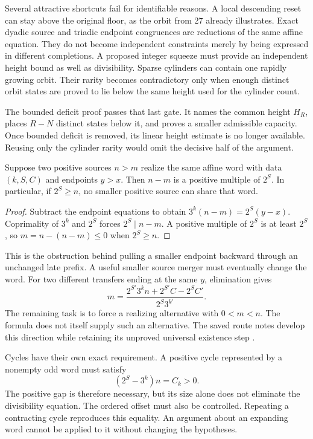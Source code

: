 Several attractive shortcuts fail for identifiable reasons. A local descending reset can stay above the original floor, as the orbit from 27 already illustrates. Exact dyadic source and triadic endpoint congruences are reductions of the same affine equation. They do not become independent constraints merely by being expressed in different completions. A proposed integer squeeze must provide an independent height bound as well as divisibility. Sparse cylinders can contain one rapidly growing orbit. Their rarity becomes contradictory only when enough distinct orbit states are proved to lie below the same height used for the cylinder count.

The bounded deficit proof passes that last gate. It names the common height $H_R$, places $R-N$ distinct states below it, and proves a smaller admissible capacity. Once bounded deficit is removed, its linear height estimate is no longer available. Reusing only the cylinder rarity would omit the decisive half of the argument.

\begin{proposition}\label{prop:merger}
Suppose two positive sources $n>m$ realize the same affine word with data $(k,S,C)$ and endpoints $y>x$. Then $n-m$ is a positive multiple of $2^S$. In particular, if $2^S\ge n$, no smaller positive source can share that word.
\end{proposition}
\begin{proof}
Subtract the endpoint equations to obtain $3^k(n-m)=2^S(y-x)$. Coprimality of $3^k$ and $2^S$ forces $2^S\mid n-m$. A positive multiple of $2^S$ is at least $2^S$, so $m=n-(n-m)\le0$ when $2^S\ge n$.
\end{proof}

This is the obstruction behind pulling a smaller endpoint backward through an unchanged late prefix. A useful smaller source merger must eventually change the word. For two different transfers ending at the same $y$, elimination gives
\[
m=\frac{2^{S'}3^k n+2^{S'}C-2^S C'}{2^S3^{k'}}.
\]
The remaining task is to force a realizing alternative with $0<m<n$. The formula does not itself supply such an alternative. The saved route notes develop this direction while retaining its unproved universal existence step \cite{projectcollatzroutes}.

Cycles have their own exact requirement. A positive cycle represented by a nonempty odd word must satisfy
\[
(2^S-3^k)n=C_k>0.
\]
The positive gap is therefore necessary, but its size alone does not eliminate the divisibility equation. The ordered offset must also be controlled. Repeating a contracting cycle reproduces this equality. An argument about an expanding word cannot be applied to it without changing the hypotheses.

